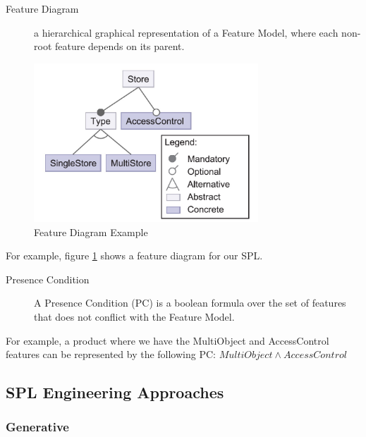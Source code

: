 \documentclass[11pt]{article}
\begin{document}
\begin{description}

\item[Feature Diagram]
a hierarchical graphical representation of a Feature Model, where each non-root feature depends on its parent.

\end{description}

\begin{figure}
  \centering
    \includegraphics[width=0.75\textwidth]{FeatureDiagram}
  \caption{Feature Diagram Example}
  \label{fig:FeatureDiagram}
\end{figure}

For example, figure \ref{fig:FeatureDiagram} shows a feature diagram for our SPL.

\begin{description}

\item[Presence Condition]
A Presence Condition (PC) is a boolean formula over the set of features that does not conflict with the Feature Model.
\end{description}

For example, a product where we have the MultiObject and AccessControl features can be represented by the following PC: $ MultiObject \wedge AccessControl $

\subsection{SPL Engineering Approaches}

\subsubsection{Generative}

%
\end{document}
